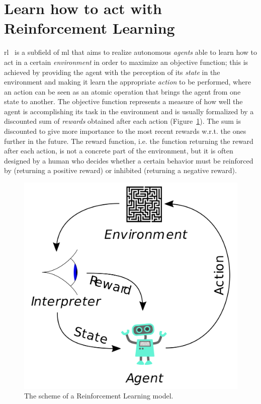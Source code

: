\section{Learn how to act with Reinforcement Learning}
\gls{rl}~\cite{sutton1998reinforcement} is a subfield of \gls{ml} that aims to realize autonomous \textit{agents} able to learn how to act in a certain \textit{environment} in order to maximize an objective function; this is achieved by providing the agent with the perception of its \textit{state} in the environment and making it learn the appropriate \textit{action} to be performed, where an action can be seen as an atomic operation that brings the agent from one state to another. The objective function represents a measure of how well the agent is accomplishing its task in the environment and is usually formalized by a discounted sum of \textit{rewards} obtained after each action (Figure~\ref{F:rl}). The sum is discounted to give more importance to the most recent rewards w.r.t. the ones further in the future. The reward function, i.e. the function returning the reward after each action, is not a concrete part of the environment, but it is often designed by a human who decides whether a certain behavior must be reinforced by (returning a positive reward) or inhibited (returning a negative reward).

\begin{figure}[t]
\begin{minipage}{\textwidth}
\begin{center}
  \includegraphics[scale=.1]{img/rl.png}
\end{center}
\end{minipage}
\caption[Reinforcement Learning problem scheme]{The scheme of a Reinforcement Learning model.}\label{F:rl}
\end{figure}

